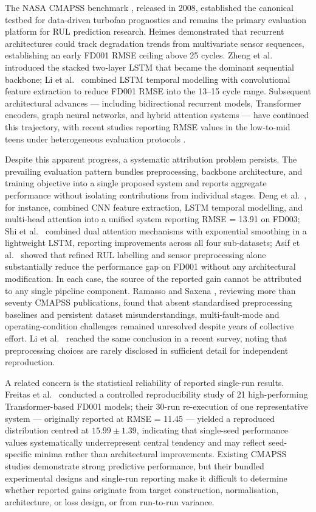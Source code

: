\documentclass[preprint,10pt]{elsarticle}
\begin{document}
The NASA CMAPSS benchmark \cite{ref01}, released in 2008, established the canonical testbed for data-driven turbofan prognostics and remains the primary evaluation platform for RUL prediction research. Heimes \cite{ref02} demonstrated that recurrent architectures could track degradation trends from multivariate sensor sequences, establishing an early FD001 RMSE ceiling above 25 cycles. Zheng et al.\ \cite{ref05} introduced the stacked two-layer LSTM that became the dominant sequential backbone; Li et al.\ \cite{ref06} combined LSTM temporal modelling with convolutional feature extraction to reduce FD001 RMSE into the 13--15 cycle range. Subsequent architectural advances --- including bidirectional recurrent models, Transformer encoders, graph neural networks, and hybrid attention systems --- have continued this trajectory, with recent studies reporting RMSE values in the low-to-mid teens under heterogeneous evaluation protocols \cite{ref13,ref15,ref29}.

Despite this apparent progress, a systematic attribution problem persists. The prevailing evaluation pattern bundles preprocessing, backbone architecture, and training objective into a single proposed system and reports aggregate performance without isolating contributions from individual stages. Deng et al.\ \cite{ref29}, for instance, combined CNN feature extraction, LSTM temporal modelling, and multi-head attention into a unified system reporting RMSE = 13.91 on FD003; Shi et al.\ \cite{ref50} combined dual attention mechanisms with exponential smoothing in a lightweight LSTM, reporting improvements across all four sub-datasets; Asif et al.\ \cite{ref42} showed that refined RUL labelling and sensor preprocessing alone substantially reduce the performance gap on FD001 without any architectural modification. In each case, the source of the reported gain cannot be attributed to any single pipeline component. Ramasso and Saxena \cite{ref03}, reviewing more than seventy CMAPSS publications, found that absent standardised preprocessing baselines and persistent dataset misunderstandings, multi-fault-mode and operating-condition challenges remained unresolved despite years of collective effort. Li et al.\ \cite{ref17} reached the same conclusion in a recent survey, noting that preprocessing choices are rarely disclosed in sufficient detail for independent reproduction.

A related concern is the statistical reliability of reported single-run results. Freitas et al.\ \cite{ref51} conducted a controlled reproducibility study of 21 high-performing Transformer-based FD001 models; their 30-run re-execution of one representative system --- originally reported at RMSE = 11.45 --- yielded a reproduced distribution centred at $15.99 \pm 1.39$, indicating that single-seed performance values systematically underrepresent central tendency and may reflect seed-specific minima rather than architectural improvements. Existing CMAPSS studies demonstrate strong predictive performance, but their bundled experimental designs and single-run reporting make it difficult to determine whether reported gains originate from target construction, normalisation, architecture, or loss design, or from run-to-run variance.
\end{document}
